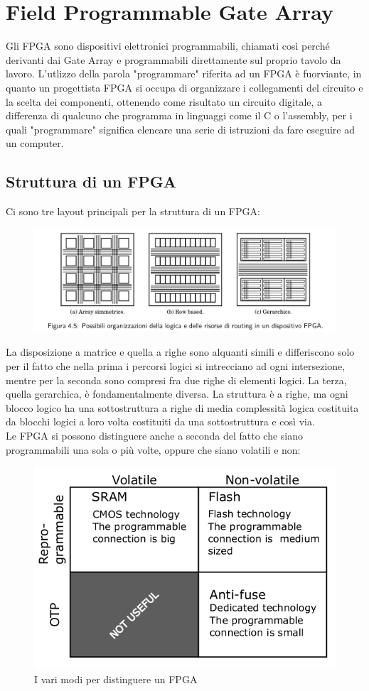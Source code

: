 \documentclass{book}
\begin{document}
\chapter{Field Programmable Gate Array}
    Gli FPGA sono dispositivi elettronici programmabili, chiamati così perché derivanti dai Gate Array e programmabili direttamente sul proprio tavolo da lavoro. L'utlizzo della parola "programmare" riferita ad un FPGA è fuorviante, in quanto un progettista FPGA si occupa di organizzare i collegamenti del circuito e la scelta dei componenti, ottenendo come risultato un circuito digitale, a differenza di qualcuno che programma in linguaggi come il C o l'assembly, per i quali "programmare" significa elencare una serie di istruzioni da fare eseguire ad un computer.
\section{Struttura di un FPGA}
    Ci sono tre layout principali per la struttura di un FPGA:
    \begin{figure}[h!]
        \centering
        \includegraphics[width=0.75\linewidth]{img/chapt4img1.png}
    \end{figure}
    La disposizione a matrice e quella a righe sono alquanti simili e differiscono solo per il fatto che nella prima i percorsi logici si intrecciano ad ogni intersezione, mentre per la seconda sono compresi fra due righe di elementi logici. La terza, quella gerarchica, è fondamentalmente diversa. La struttura è a righe, ma ogni blocco logico ha una sottostruttura a righe di media complessità logica costituita da blocchi logici a loro volta costituiti da una sottostruttura e così via.\\
    Le FPGA si possono distinguere anche a seconda del fatto che siano programmabili una sola o più volte, oppure che siano volatili e non:
    \begin{figure}[h!]
        \centering
        \includegraphics[width=0.75\linewidth]{img/chapt4img2.png}
        \caption{I vari modi per distinguere un FPGA}
    \end{figure}\\
\end{document}

